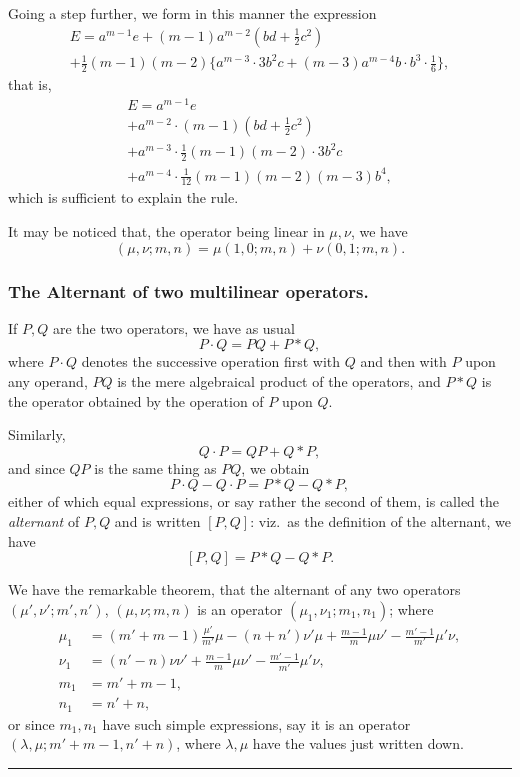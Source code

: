 \documentclass[11pt,a4paper]{article}
\theoremstyle{plain}
\begin{document}
\newpage
\noindent Going a step further, we form in this manner the expression
\begin{multline*}
E = a^{m-1}e + (m-1)a^{m-2}(bd + \tfrac{1}{2}c^2) \\
+ \tfrac{1}{2}(m-1)(m-2)\{a^{m-3} \cdot 3b^2c + (m-3)a^{m-4}b \cdot b^3 \cdot \tfrac{1}{6}\},
\end{multline*}
that is,
\begin{multline*}
E = a^{m-1}e \\
+ a^{m-2} \cdot (m-1)(bd + \tfrac{1}{2}c^2) \\
+ a^{m-3} \cdot \tfrac{1}{2}(m-1)(m-2) \cdot 3b^2c \\
+ a^{m-4} \cdot \tfrac{1}{12}(m-1)(m-2)(m-3)b^4,
\end{multline*}
which is sufficient to explain the rule.

It may be noticed that, the operator being linear in $\mu, \nu$, we have
\[
(\mu, \nu; m, n) = \mu(1, 0; m, n) + \nu(0, 1; m, n).
\]

\subsubsection*{The Alternant of two multilinear operators.}

If $P, Q$ are the two operators, we have as usual
\[
P \cdot Q = PQ + P * Q,
\]
where $P \cdot Q$ denotes the successive operation first with $Q$ and then with $P$ upon any
operand, $PQ$ is the mere algebraical product of the operators, and $P * Q$ is the operator
obtained by the operation of $P$ upon $Q$.

Similarly,
\[
Q \cdot P = QP + Q * P,
\]
and since $QP$ is the same thing as $PQ$, we obtain
\[
P \cdot Q - Q \cdot P = P * Q - Q * P,
\]
either of which equal expressions, or say rather the second of them, is called the
\textit{alternant} of $P, Q$ and is written $[P, Q]$: viz.\ as the definition of the alternant, we have
\[
[P, Q] = P * Q - Q * P.
\]

We have the remarkable theorem, that the alternant of any two operators $(\mu', \nu'; m', n')$,
$(\mu, \nu; m, n)$ is an operator $(\mu_1, \nu_1; m_1, n_1)$; where
\begin{align*}
\mu_1 &= (m' + m - 1)\frac{\mu'}{m'}\mu - (n + n')\nu'\mu + \frac{m - 1}{m}\mu\nu' - \frac{m' - 1}{m'}\mu'\nu, \\
\nu_1 &= (n' - n)\nu\nu' + \frac{m - 1}{m}\mu\nu' - \frac{m' - 1}{m'}\mu'\nu, \\
m_1 &= m' + m - 1, \\
n_1 &= n' + n,
\end{align*}
or since $m_1, n_1$ have such simple expressions, say it is an operator $(\lambda, \mu; m' + m - 1, n' + n)$,
where $\lambda, \mu$ have the values just written down.

\vspace{1cm}
\begin{center}
\rule{0.5\textwidth}{0.4pt}
\end{center}
\end{document}
